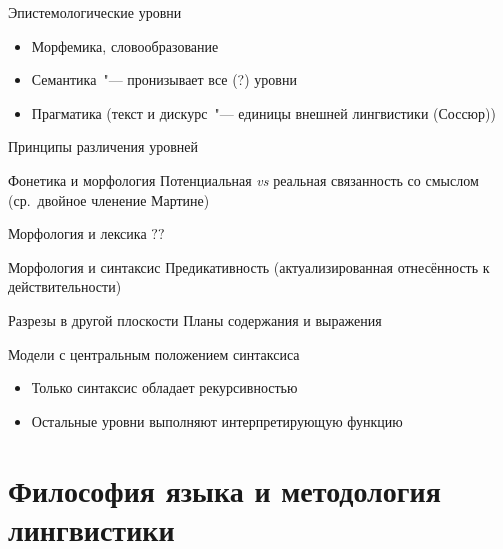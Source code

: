 \begin{frame}{Эпистемологические уровни}
    \begin{itemize}
        \item Морфемика, словообразование
        \item Семантика~"--- пронизывает все (?) уровни
        \item Прагматика (текст и дискурс~"--- единицы внешней лингвистики (Соссюр))
    \end{itemize}
\end{frame}

\begin{frame}{Принципы различения уровней}
    \begin{block}{Фонетика и морфология}
        Потенциальная \textit{vs} реальная связанность со смыслом (ср.\ двойное членение Мартине)
    \end{block}

    \begin{block}{Морфология и лексика}
        $??$
    \end{block}

    \begin{block}{Морфология и синтаксис}
        Предикативность (актуализированная отнесённость к действительности)
    \end{block}
\end{frame}

\begin{frame}{Разрезы в другой плоскости}
    Планы содержания и выражения

    Модели с центральным положением синтаксиса
    \begin{itemize}
        \item Только синтаксис обладает рекурсивностью
        \item Остальные уровни выполняют интерпретирующую функцию
    \end{itemize}
\end{frame}

\section{Философия языка и методология лингвистики}

